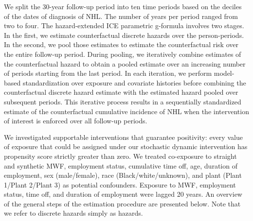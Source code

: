 \documentclass[
  11pt,
  letterpaper,
  DIV=11,
  numbers=noendperiod]{scrartcl}
\begin{document}
We split the 30-year follow-up period into ten time periods based on the
deciles of the dates of diagnosis of NHL. The number of years per period
ranged from two to four. The hazard-extended ICE parametric g-formula
involves two stages. In the first, we estimate counterfactual discrete
hazards over the person-periods. In the second, we pool those estimates
to estimate the counterfactual risk over the entire follow-up period.
During pooling, we iteratively combine estimates of the counterfactual
hazard to obtain a pooled estimate over an increasing number of periods
starting from the last period. In each iteration, we perform model-based
standardization over exposure and covariate histories before combining
the counterfactual discrete hazard estimate with the estimated hazard
pooled over subsequent periods. This iterative process results in a
sequentially standardized estimate of the counterfactual cumulative
incidence of NHL when the intervention of interest is enforced over all
follow-up periods.

We investigated supportable interventions that guarantee positivity:
every value of exposure that could be assigned under our stochastic
dynamic intervention has propensity score strictly greater than zero. We
treated co-exposure to straight and synthetic MWF, employment status,
cumulative time off, age, duration of employment, sex (male/female),
race (Black/white/unknown), and plant (Plant 1/Plant 2/Plant 3) as
potential confounders. Exposure to MWF, employment status, time off, and
duration of employment were lagged 20 years. An overview of the general
steps of the estimation procedure are presented below. Note that we
refer to discrete hazards simply as hazards.
\end{document}
